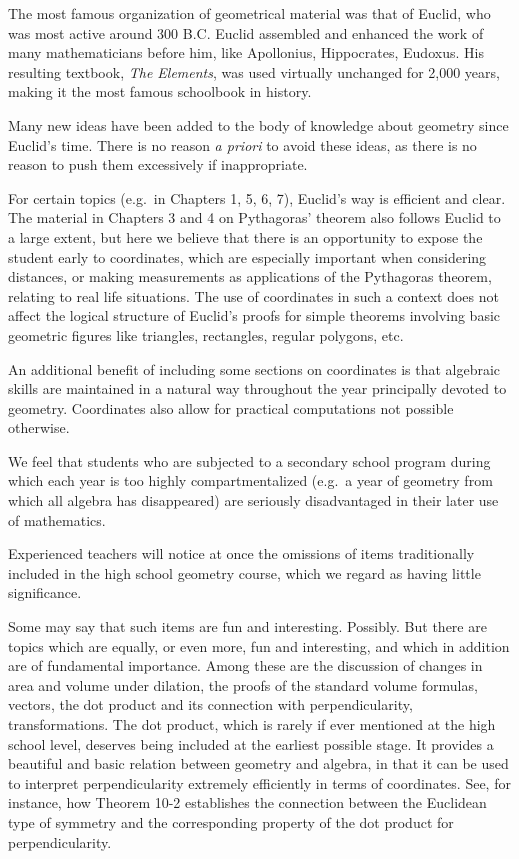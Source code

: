 \documentclass[12pt]{book} %
\begin{document}
The most famous organization of geometrical material was that of Euclid, who was most active around 300 B.C. Euclid assembled and enhanced the work of many mathematicians before him, like Apollonius, Hippocrates, Eudoxus. His resulting textbook, \textit{The Elements}, was used virtually unchanged for 2,000 years, making it the most famous schoolbook in history.

Many new ideas have been added to the body of knowledge about geometry since Euclid's time. There is no reason \textit{a priori} to avoid these ideas, as there is no reason to push them excessively if inappropriate.

For certain topics (e.g.\ in Chapters 1, 5, 6, 7), Euclid's way is efficient and clear. The material in Chapters 3 and 4 on Pythagoras' theorem also follows Euclid to a large extent, but here we believe that there is an opportunity to expose the student early to coordinates, which are especially important when considering distances, or making measurements as applications of the Pythagoras theorem, relating to real life situations. The use of coordinates in such a context does not affect the logical structure of Euclid's proofs for simple theorems involving basic geometric figures like triangles, rectangles, regular polygons, etc.

An additional benefit of including some sections on coordinates is that algebraic skills are maintained in a natural way throughout the year principally devoted to geometry. Coordinates also allow for practical computations not possible otherwise.

We feel that students who are subjected to a secondary school program during which each year is too highly compartmentalized (e.g.\ a year of geometry from which all algebra has disappeared) are seriously disadvantaged in their later use of mathematics.

Experienced teachers will notice at once the omissions of items traditionally included in the high school geometry course, which we regard as having little significance.

Some may say that such items are fun and interesting. Possibly. But there are topics which are equally, or even more, fun and interesting, and which in addition are of fundamental importance. Among these are the discussion of changes in area and volume under dilation, the proofs of the standard volume formulas, vectors, the dot product and its connection with perpendicularity, transformations. The dot product, which is rarely if ever mentioned at the high school level, deserves being included at the earliest possible stage. It provides a beautiful and basic relation between geometry and algebra, in that it can be used to interpret perpendicularity extremely efficiently in terms of coordinates. See, for instance, how Theorem 10-2 establishes the connection between the Euclidean type of symmetry and the corresponding property of the dot product for perpendicularity.
\end{document}
